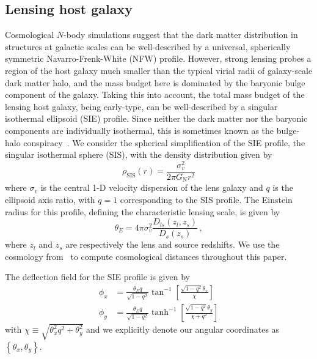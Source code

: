 \documentclass[twocolumn]{aastex63}
\begin{document}
\subsection{Lensing host galaxy}

Cosmological $N$-body simulations suggest that the dark matter distribution in structures at galactic scales can be well-described by a universal, spherically symmetric Navarro-Frenk-White (NFW) profile. However, strong lensing probes a region of the host galaxy much smaller than the typical virial radii of galaxy-scale dark matter halo, and the mass budget here is dominated by the baryonic bulge component of the galaxy. Taking this into account, the total mass budget of the lensing host galaxy, being early-type, can be well-described by a singular isothermal ellipsoid (SIE) profile. Since neither the dark matter nor the baryonic components are individually isothermal, this is sometimes known as the bulge-halo conspiracy~\citep{1003.5567}. We consider the spherical simplification of the SIE profile, the singular isothermal sphere (SIS), with the density distribution given by~\citep{1994A&A...284..285K,1003.5567}
\begin{equation}
\rho_\mathrm{SIS}(r)=\frac{\sigma_{v}^{2}}{2 \pi G_\mathrm{N} r^2}
\label{eq:hostprofile}
\end{equation}
where $\sigma_{v}$ is the central 1-D velocity dispersion of the lens galaxy and $q$ is the ellipsoid axis ratio, with $q=1$ corresponding to the SIS profile. The Einstein radius for this profile, defining the characteristic lensing scale, is given by~\citep{1003.5567}
\begin{equation}
\theta_{{E}}=4 \pi\sigma_{v}^{2} \frac{D_{l s}\left(z_{l}, z_{s}\right)}{D_{s}\left(z_{s}\right)} \,,
\label{eq:siethetae}
\end{equation}
where $z_{l}$ and $z_{s}$ are respectively the lens and source redshifts. We use the cosmology from~\citet{1502.01589} to compute cosmological distances throughout this paper.

The deflection field for the SIE profile is given by~\citep{2001astro.ph..2341K}
\begin{align}
\phi_{x} &=\frac{\theta_E q}{\sqrt{1-q^{2}}} \tan ^{-1}\left[\frac{\sqrt{1-q^{2}} \theta_x}{\chi}\right] \\
\phi_{y} &=\frac{\theta_E q}{\sqrt{1-q^{2}}} \tanh ^{-1}\left[\frac{\sqrt{1-q^{2}} \theta_y}{\chi+q^{2} }\right]
\end{align}
with $\chi \equiv \sqrt{\theta_x^2 q^2 + \theta_y^2}$ and we explicitly denote our angular coordinates as $\left\{\theta_x, \theta_y\right\}$.
\end{document}
